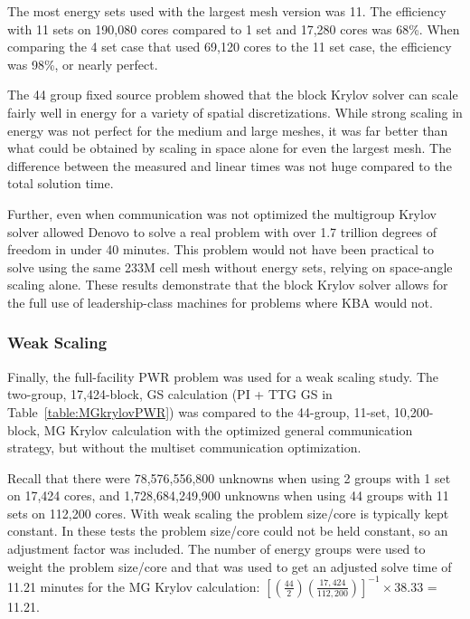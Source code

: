 The most energy sets used with the largest mesh version was 11. The efficiency with 11 sets on 190,080 cores compared to 1 set and 17,280 cores was 68\%. When comparing the 4 set case that used 69,120 cores to the 11 set case, the efficiency was 98\%, or nearly perfect. 

The 44 group fixed source problem showed that the block Krylov solver can scale fairly well in energy for a variety of spatial discretizations. While strong scaling in energy was not perfect for the medium and large meshes, it was far better than what could be obtained by scaling in space alone for even the largest mesh. The difference between the measured and linear times was not huge compared to the total solution time. 

Further, even when communication was not optimized the multigroup Krylov solver allowed Denovo to solve a real problem with over 1.7 trillion degrees of freedom in under 40 minutes. This problem would not have been practical to solve using the same 233M cell mesh without energy sets, relying on space-angle scaling alone. These results demonstrate that the block Krylov solver allows for the full use of leadership-class machines for problems where KBA would not.

\subsubsection{Weak Scaling}
Finally, the full-facility PWR problem was used for a weak scaling study. The two-group, 17,424-block, GS calculation (PI + TTG GS in Table~\ref{table:MGkrylovPWR}) was compared to the 44-group, 11-set, 10,200-block, MG Krylov calculation with the optimized general communication strategy, but without the multiset communication optimization. 

Recall that there were 78,576,556,800 unknowns when using 2 groups with 1 set on 17,424 cores, and 1,728,684,249,900 unknowns when using 44 groups with 11 sets on 112,200 cores. With weak scaling the problem size/core is typically kept constant. In these tests the problem size/core could not be held constant, so an adjustment factor was included. The number of energy groups were used to weight the problem size/core and that was used to get an adjusted solve time of 11.21 minutes for the MG Krylov calculation: $[(\frac{44}{2})(\frac{17,424}{112,200})]^{-1}\times38.33$ = 11.21. 

